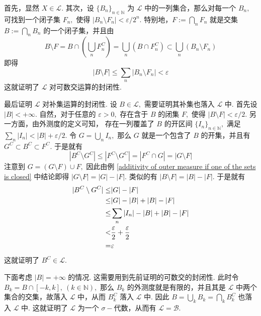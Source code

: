\documentclass[12pt, a4paper, oneside]{book}
\numberwithin{figure}{section}
\theoremstyle{definition}
\begin{document}
首先，显然 $X\in \mathcal L.$ 其次，设 $\{B_n\}_{n\in\mathbb N}$ 为 $\mathcal L$ 中的一列集合，那么对每一个 $B_n,$ 可找到一个闭子集 $F_n,$ 使得 
$|B_n\setminus F_n|<\varepsilon/2^n.$ 特别地，$F:=\bigcap_n F_n$ 就是交集 $B:=\bigcap_n B_n$ 的一个闭子集，并且由
\begin{equation}
    B\setminus F=B\cap\left(\bigcup_n F_n^C\right)=\bigcup_n (B\cap F_n^C)\subset\bigcup_n (B_n\setminus F_n)
\end{equation}
即得
\begin{equation}
    |B\setminus F|\leq\sum_n |B_n\setminus F_n|<\varepsilon
\end{equation}
这就证明了 $\mathcal L$ 对可数交运算的封闭性.

最后证明 $\mathcal L$ 对补集运算的封闭性. 设 $B\in\mathcal L,$ 需要证明其补集也落入 $\mathcal L$ 中. 首先设 $|B|<+\infty.$
自然，对于任意的 $\varepsilon>0,$ 存在含于 $B$ 的闭集 $F,$ 使得 $|B\setminus F|<\varepsilon/2.$ 另一方面，由外测度的定义可知，
存在一列覆盖了 $B$ 的开区间 $\{I_n\}_{n\in\mathbb N},$ 满足 $\sum_n |I_n|<|B|+\varepsilon/2.$ 
令 $G=\bigcup_n I_n,$ 那么 $G$ 就是一个包含了 $B$ 的开集，并且有 $G^C\subset B^C\subset F^C.$
于是就有
\begin{equation}
    |B^C\setminus G^C|\leq |F^C\setminus G^C|=|F^C\cap G|=|G\setminus F|
\end{equation}
注意到 $G=(G\setminus F)\cup F,$ 因此由例 \ref{additivity of outer measure if one of the sets is closed} 中结论即得
$|G\setminus F|=|G|-|F|.$ 类似的有 $|B\setminus F|=|B|-|F|.$ 于是就有
\begin{equation}
    \begin{aligned}
        |B^C\setminus G^C|\leq& |G|-|F|\\
        \leq& |G|-|B|+|B|-|F|\\
        \leq&\sum_n |I_n|-|B|+|B|-|F|\\
        <&{\varepsilon\over 2}+{\varepsilon\over 2}\\
        =&\varepsilon
    \end{aligned}
\end{equation}
这就证明了 $B^C\in\mathcal L.$ 

下面考虑 $|B|=+\infty$ 的情况. 这需要用到先前证明的可数交的封闭性. 此时令 $B_k=B\cap [-k,k],\ (k\in\mathbb N),$ 那么 $B_k$ 的外测度就是有限的，并且其是 $\mathcal L$ 中两个集合的交集，故落入 $\mathcal L$ 中，从而 $B_k^C$ 落入 $\mathcal L$ 中.
因此 $B=\bigcup_k B_k=\bigcap_k B_k^C$ 也落入 $\mathcal L$ 中. 这就证明了 $\mathcal L$ 为一个 $\sigma-$代数，从而有 $\mathcal L=\mathcal B.$
\end{document}
